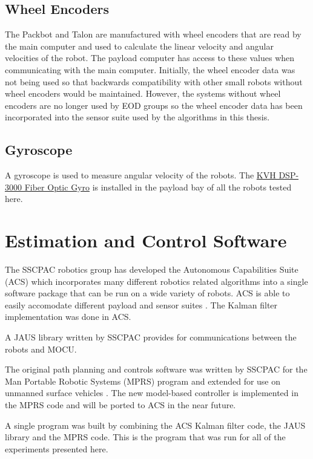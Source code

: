 \subsection{Wheel Encoders}
\label{sec:bgEncoders}
The Packbot and Talon are manufactured with wheel encoders that are read by the main computer and used to calculate the linear velocity and angular velocities of the robot. The payload computer has access to these values when communicating with the main computer. Initially, the wheel encoder data was not being used so that backwards compatibility with other small robots without wheel encoders would be maintained. However, the systems without wheel encoders are no longer used by EOD groups so the wheel encoder data has been incorporated into the sensor suite used by the algorithms in this thesis.

\subsection{Gyroscope}
\label{sec:bgGyro}
A gyroscope is used to measure angular velocity of the robots. The \href{http://www.kvh.com/Commercial-and-OEM/Gyros-and-Inertial-Systems-and-Compasses/Gyros-and-IMUs-and-INS/Fiber-Optic-Gyros/DSP-3000.aspx}{KVH DSP-3000 Fiber Optic Gyro} is installed in the payload bay of all the robots tested here.

\section{Estimation and Control Software}
\label{sec:bgSoftware}
The SSCPAC robotics group has developed the Autonomous Capabilities Suite (ACS) which incorporates many different robotics related algorithms into a single software package that can be run on a wide variety of robots. ACS is able to easily accomodate different payload and sensor suites \cite{Sights06}. The Kalman filter implementation was done in ACS.

A JAUS library written by SSCPAC provides for communications between the robots and MOCU.

The original path planning and controls software was written by SSCPAC for the Man Portable Robotic Systems (MPRS) program \cite{Bruch02} and extended for use on unmanned surface vehicles \cite{Ebken05, Larson06, Larson07}. The new model-based controller is implemented in the MPRS code and will be ported to ACS in the near future.

A single program was built by combining the ACS Kalman filter code, the JAUS library and the MPRS code. This is the program that was run for all of the experiments presented here.
